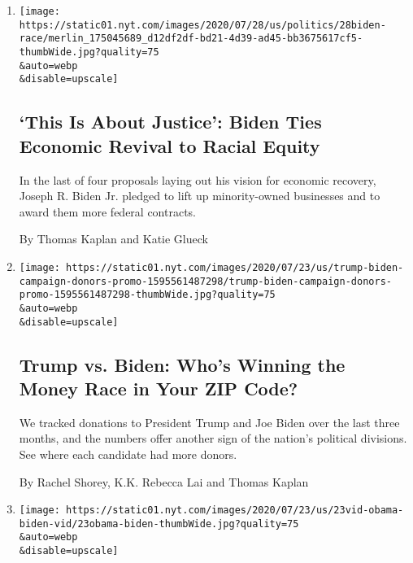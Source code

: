 \begin{enumerate}
\def\labelenumi{\arabic{enumi}.}
\item
  \href{/2020/07/28/us/politics/joe-biden-racial-justice-economy-plan.html}{}

  \texttt{[image: https://static01.nyt.com/images/2020/07/28/us/politics/28biden-race/merlin\_175045689\_d12df2df-bd21-4d39-ad45-bb3675617cf5-thumbWide.jpg?quality=75\\\&auto=webp\\\&disable=upscale]}

  \hypertarget{this-is-about-justice-biden-ties-economic-revival-to-racial-equity}{%
  \subsection{`This Is About Justice': Biden Ties Economic Revival to
  Racial
  Equity}\label{this-is-about-justice-biden-ties-economic-revival-to-racial-equity}}

  In the last of four proposals laying out his vision for economic
  recovery, Joseph R. Biden Jr. pledged to lift up minority-owned
  businesses and to award them more federal contracts.

  By Thomas Kaplan and Katie Glueck
\item
  \href{/interactive/2020/07/24/us/politics/trump-biden-campaign-donors.html}{}

  \texttt{[image: https://static01.nyt.com/images/2020/07/23/us/trump-biden-campaign-donors-promo-1595561487298/trump-biden-campaign-donors-promo-1595561487298-thumbWide.jpg?quality=75\\\&auto=webp\\\&disable=upscale]}

  \hypertarget{trump-vs-biden-whos-winning-the-money-race-in-your-zip-code}{%
  \subsection{Trump vs. Biden: Who's Winning the Money Race in Your ZIP
  Code?}\label{trump-vs-biden-whos-winning-the-money-race-in-your-zip-code}}

  We tracked donations to President Trump and Joe Biden over the last
  three months, and the numbers offer another sign of the nation's
  political divisions. See where each candidate had more donors.

  By Rachel Shorey, K.K. Rebecca Lai and Thomas Kaplan
\item
  \href{/2020/07/23/us/politics/barack-obama-joe-biden-video.html}{}

  \texttt{[image: https://static01.nyt.com/images/2020/07/23/us/23vid-obama-biden-vid/23obama-biden-thumbWide.jpg?quality=75\\\&auto=webp\\\&disable=upscale]}


\end{enumerate}
